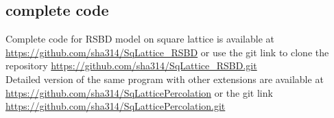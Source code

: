	
	
	\subsection{complete code}
	Complete code for RSBD model on square lattice is available at
	\url{https://github.com/sha314/SqLattice_RSBD}
	or use the git link to clone the repository
	\url{https://github.com/sha314/SqLattice_RSBD.git}
	\\
	Detailed version of the same program with other extensions are available at
	\url{https://github.com/sha314/SqLatticePercolation}
	or the git link
	\url{https://github.com/sha314/SqLatticePercolation.git}




